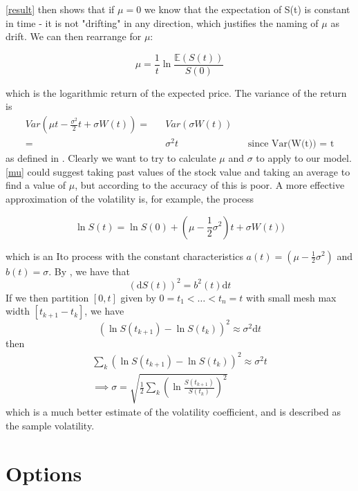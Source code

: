 \documentclass[11pt]{article} %
\begin{document}
\ref{result} then shows that if $\mu = 0$ we know that the expectation of S(t) is 
constant in time - it is not "drifting" in any direction, which justifies the 
naming of $\mu$ as drift. We can then rearrange for $\mu$:

\begin{equation} \label{mu}
    \mu = \frac{1}{t}\ln{\frac{\mathbb{E}(S(t))}{S(0)}}
\end{equation}

which is the logarithmic return of the expected price.
The variance of the return is 
\begin{align}
    Var(\mu t - \frac{\sigma^2}{2}t + \sigma W(t)) = && Var(\sigma W(t)) \\
    = && \sigma^2t  && \text{since Var(W(t)) = t}
\end{align}
as defined in \cite{blackscholes}. Clearly we want to try to calculate $\mu$ and 
$\sigma$ to apply to our model. \ref{mu} could suggest taking past values of the 
stock value and taking an average to find a value of $\mu$, but according to 
\cite{blackscholes} the accuracy of this is poor. 
A more effective approximation of the volatility is, for example, the process 

\begin{equation}
    \ln{S(t)} = \ln{S(0)} + (\mu - \frac{1}{2}\sigma^2)t + \sigma W(t))
\end{equation}

which is an Ito process with the constant characteristics $a(t) = (\mu - \frac{1}{2}\sigma^2)$
 and $b(t) = \sigma$. By \cite{quadtraticvariation}, we have that
 \begin{equation}
     (\mathrm{d}S(t))^2 = b^2(t) \mathrm{d}t
 \end{equation}
 If we then partition $[0,t]$ given by $0 = t_1 < \dots < t_n = t$ with small mesh max 
 width $[t_{k+1} - t_k]$, we have 
 \begin{equation}
     (\ln{S(t_{k+1}) - \ln{S(t_k)}})^2 \approx \sigma^2 \mathrm{d}t
 \end{equation}
then 
\begin{align}
    \sum_k (\ln{S(t_{k+1}) - \ln{S(t_k)}})^2 \approx \sigma^2 t\\
    \implies
    \sigma = \sqrt{\frac{1}{2}\sum_k (\ln{\frac{S(t_{k+1})}{S(t_k)}})^2}
    \label{volatilityapprox}
\end{align}
which is a much better estimate of the volatility coefficient, and is described as the 
sample volatility.
\section{Options}
\end{document}
